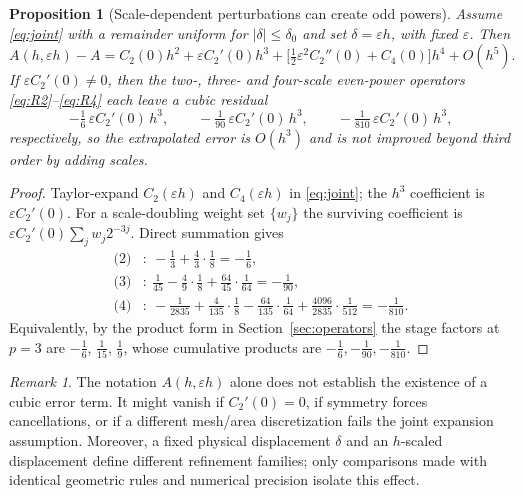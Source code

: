 \documentclass[11pt]{article}
\newtheorem{proposition}{Proposition}
\theoremstyle{remark}
\newtheorem{remark}{Remark}
\begin{document}
\begin{proposition}[Scale-dependent perturbations can create odd powers]\label{prop:cubic}
Assume \eqref{eq:joint} with a remainder uniform for $|\delta|\le\delta_0$ and set
$\delta=\varepsilon h$, with fixed $\varepsilon$. Then
\begin{equation}\label{eq:cubic}
A(h,\varepsilon h)-A=C_2(0)h^2+\varepsilon C_2'(0)h^3
+\Big[\tfrac12\varepsilon^2C_2''(0)+C_4(0)\Big]h^4+O(h^5).
\end{equation}
If $\varepsilon C_2'(0)\neq0$, then the two-, three- and four-scale even-power operators
\eqref{eq:R2}--\eqref{eq:R4} each leave a cubic residual
\[
-\tfrac16\,\varepsilon C_2'(0)\,h^3,\qquad
-\tfrac1{90}\,\varepsilon C_2'(0)\,h^3,\qquad
-\tfrac1{810}\,\varepsilon C_2'(0)\,h^3,
\]
respectively, so the extrapolated error is $O(h^3)$ and is not improved beyond third order by
adding scales.
\end{proposition}

\begin{proof}
Taylor-expand $C_2(\varepsilon h)$ and $C_4(\varepsilon h)$ in \eqref{eq:joint}; the $h^3$
coefficient is $\varepsilon C_2'(0)$. For a scale-doubling weight set $\{w_j\}$ the surviving
coefficient is $\varepsilon C_2'(0)\sum_jw_j2^{-3j}$. Direct summation gives
\begin{align*}
\text{(2)}&:\ -\tfrac13+\tfrac43\cdot\tfrac18=-\tfrac16,\\
\text{(3)}&:\ \tfrac1{45}-\tfrac49\cdot\tfrac18+\tfrac{64}{45}\cdot\tfrac1{64}=-\tfrac1{90},\\
\text{(4)}&:\ -\tfrac1{2835}+\tfrac4{135}\cdot\tfrac18-\tfrac{64}{135}\cdot\tfrac1{64}
+\tfrac{4096}{2835}\cdot\tfrac1{512}=-\tfrac1{810}.
\end{align*}
Equivalently, by the product form in Section~\ref{sec:operators} the stage factors at $p=3$
are $-\tfrac16$, $\tfrac1{15}$, $\tfrac19$, whose cumulative products are
$-\tfrac16,-\tfrac1{90},-\tfrac1{810}$.
\end{proof}

\begin{remark}
The notation $A(h,\varepsilon h)$ alone does not establish the existence of a cubic error
term. It might vanish if $C_2'(0)=0$, if symmetry forces cancellations, or if a different
mesh/area discretization fails the joint expansion assumption. Moreover, a fixed physical
displacement $\delta$ and an $h$-scaled displacement define different refinement families; only
comparisons made with identical geometric rules and numerical precision isolate this effect.
\end{remark}
\end{document}
